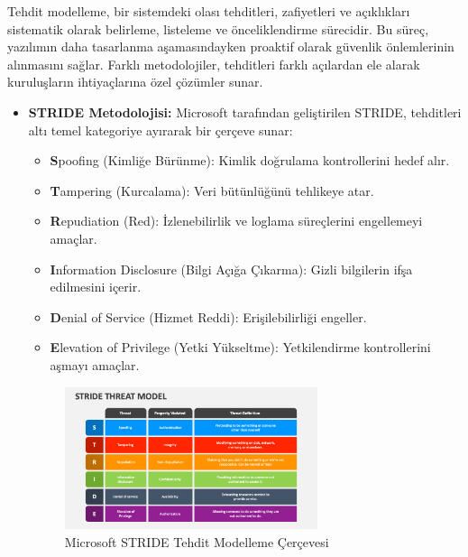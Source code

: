 Tehdit modelleme, bir sistemdeki olası tehditleri, zafiyetleri ve açıklıkları sistematik olarak belirleme, listeleme ve önceliklendirme sürecidir. Bu süreç, yazılımın daha tasarlanma aşamasındayken proaktif olarak güvenlik önlemlerinin alınmasını sağlar. Farklı metodolojiler, tehditleri farklı açılardan ele alarak kuruluşların ihtiyaçlarına özel çözümler sunar.



\begin{itemize}
\item \textbf{STRIDE Metodolojisi:} Microsoft tarafından geliştirilen STRIDE, tehditleri altı temel kategoriye ayırarak bir çerçeve sunar:
\begin{itemize}
\item \textbf{S}poofing (Kimliğe Bürünme): Kimlik doğrulama kontrollerini hedef alır.
\item \textbf{T}ampering (Kurcalama): Veri bütünlüğünü tehlikeye atar.
\item \textbf{R}epudiation (Red): İzlenebilirlik ve loglama süreçlerini engellemeyi amaçlar.
\item \textbf{I}nformation Disclosure (Bilgi Açığa Çıkarma): Gizli bilgilerin ifşa edilmesini içerir.
\item \textbf{D}enial of Service (Hizmet Reddi): Erişilebilirliği engeller.
\item \textbf{E}levation of Privilege (Yetki Yükseltme): Yetkilendirme kontrollerini aşmayı amaçlar.
\end{itemize}

\begin{figure}[H]
    \centering
    \includegraphics[width=0.7\textwidth]{img/stride-threat-model.png}
    \caption{Microsoft STRIDE Tehdit Modelleme Çerçevesi}
    \label{fig:stride-threat-model}
\end{figure}


\end{itemize}
